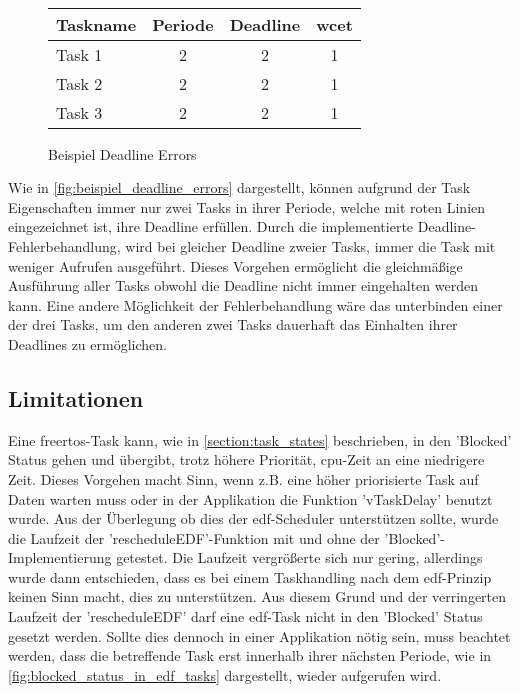 \documentclass[../EDF Master Thesis.tex]{subfiles}
\begin{document}
\begin{figure}[H]
\\
        \vspace {1cm}
        \begin{tabular}{l|c|c|c}
            Taskname & Periode & Deadline & \ac{wcet} \\
            \hline
            Task 1 & 2 & 2 & 1 \\
            Task 2 & 2 & 2 & 1 \\
            Task 3 & 2 & 2 & 1 
        \end{tabular}
        \caption{Beispiel Deadline Errors}
        \label{fig:beispiel_deadline_errors}
    \end{figure}

    Wie in \autoref{fig:beispiel_deadline_errors} dargestellt, können aufgrund der Task Eigenschaften immer nur zwei Tasks in ihrer Periode, welche mit roten Linien eingezeichnet ist, ihre Deadline erfüllen.
    Durch die implementierte Deadline-Fehlerbehandlung, wird bei gleicher Deadline zweier Tasks, immer die Task mit weniger Aufrufen ausgeführt.
    Dieses Vorgehen ermöglicht die gleichmäßige Ausführung aller Tasks obwohl die Deadline nicht immer eingehalten werden kann.
    Eine andere Möglichkeit der Fehlerbehandlung wäre das unterbinden einer der drei Tasks, um den anderen zwei Tasks dauerhaft das Einhalten ihrer Deadlines zu ermöglichen.

\clearpage

\subsection{Limitationen} \label{section:limitationen}

    Eine \ac{freertos}-Task kann, wie in \autoref{section:task_states} beschrieben, in den 'Blocked' Status gehen und übergibt, trotz höhere Priorität, \ac{cpu}-Zeit an eine niedrigere Zeit.
    Dieses Vorgehen macht Sinn, wenn z.B. eine höher priorisierte Task auf Daten warten muss oder in der Applikation die Funktion 'vTaskDelay' benutzt wurde.
    Aus der Überlegung ob dies der \ac{edf}-Scheduler unterstützen sollte, wurde die Laufzeit der 'rescheduleEDF'-Funktion mit und ohne der 'Blocked'-Implementierung getestet.
    Die Laufzeit vergrößerte sich nur gering, allerdings wurde dann entschieden, dass es bei einem Taskhandling nach dem \ac{edf}-Prinzip keinen Sinn macht, dies zu unterstützen.
    Aus diesem Grund und der verringerten Laufzeit der 'rescheduleEDF' darf eine \ac{edf}-Task nicht in den 'Blocked' Status gesetzt werden.  
    Sollte dies dennoch in einer Applikation nötig sein, muss beachtet werden, dass die betreffende Task erst innerhalb ihrer nächsten Periode, wie in \autoref{fig:blocked_status_in_edf_tasks} dargestellt, wieder aufgerufen wird.
\end{document}

